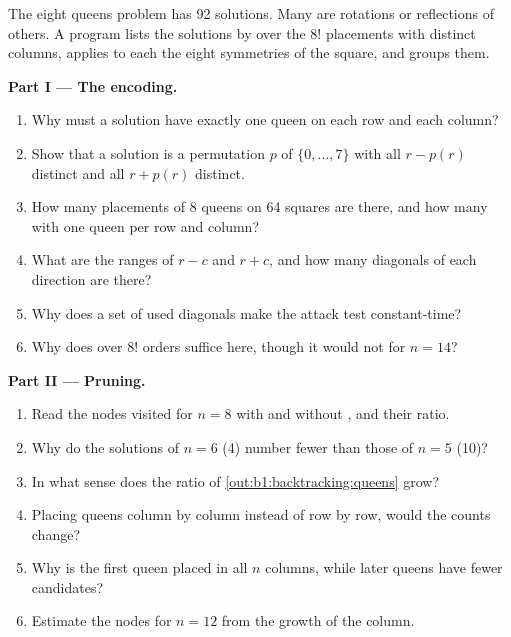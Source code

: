 \begin{problem}\label{pb:b1:backtracking:1}
The eight queens problem has 92 solutions. Many are rotations or reflections of others. A program lists the solutions by
 over the $8!$ placements with distinct columns, applies to each the eight symmetries of the square, and
groups them.
\label{out:b1:backtracking:symmetry}

\medskip\noindent\textbf{Part I --- The encoding.}
\begin{enumerate}
\item Why must a solution have exactly one queen on each row and each column?
\item Show that a solution is a permutation $p$ of $\{0, \dots, 7\}$ with all $r - p(r)$ distinct and all $r + p(r)$
distinct.
\item How many placements of 8 queens on 64 squares are there, and how many with one queen per row and column?
\item What are the ranges of $r - c$ and $r + c$, and how many diagonals of each direction are there?
\item Why does a set of used diagonals make the attack test constant-time?
\item Why does  over $8!$ orders suffice here, though it would not for $n = 14$?
\end{enumerate}

\medskip\noindent\textbf{Part II --- Pruning.}
\begin{enumerate}[resume]
\item Read the nodes visited for $n = 8$ with and without , and their ratio.
\item Why do the solutions of $n = 6$ (4) number fewer than those of $n = 5$ (10)?
\item In what sense does the ratio of \cref{out:b1:backtracking:queens} grow?
\item Placing queens column by column instead of row by row, would the counts change?
\item Why is the first queen placed in all $n$ columns, while later queens have fewer candidates?
\item Estimate the nodes for $n = 12$ from the growth of the column.
\end{enumerate}


\end{problem}
